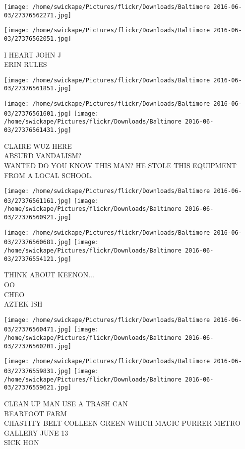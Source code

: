\documentclass[10pt,letterpaper]{article}
\begin{document}
\texttt{[image: /home/swickape/Pictures/flickr/Downloads/Baltimore 2016-06-03/27376562271.jpg]}

\vspace{0.25in}
\texttt{[image: /home/swickape/Pictures/flickr/Downloads/Baltimore 2016-06-03/27376562051.jpg]}

I HEART JOHN J\\
ERIN RULES
\pagebreak

\texttt{[image: /home/swickape/Pictures/flickr/Downloads/Baltimore 2016-06-03/27376561851.jpg]}

\vspace{0.25in}
\texttt{[image: /home/swickape/Pictures/flickr/Downloads/Baltimore 2016-06-03/27376561601.jpg]}
\texttt{[image: /home/swickape/Pictures/flickr/Downloads/Baltimore 2016-06-03/27376561431.jpg]}

CLAIRE WUZ HERE\\
ABSURD VANDALISM?\\
WANTED DO YOU KNOW THIS MAN?  HE STOLE THIS EQUIPMENT FROM A LOCAL SCHOOL.
\pagebreak

\texttt{[image: /home/swickape/Pictures/flickr/Downloads/Baltimore 2016-06-03/27376561161.jpg]}
\texttt{[image: /home/swickape/Pictures/flickr/Downloads/Baltimore 2016-06-03/27376560921.jpg]}

\texttt{[image: /home/swickape/Pictures/flickr/Downloads/Baltimore 2016-06-03/27376560681.jpg]}
\texttt{[image: /home/swickape/Pictures/flickr/Downloads/Baltimore 2016-06-03/27376554121.jpg]}

THINK ABOUT KEENON...\\
OO\\
CHEO\\
AZTEK ISH
\pagebreak

\texttt{[image: /home/swickape/Pictures/flickr/Downloads/Baltimore 2016-06-03/27376560471.jpg]}
\texttt{[image: /home/swickape/Pictures/flickr/Downloads/Baltimore 2016-06-03/27376560201.jpg]}

\texttt{[image: /home/swickape/Pictures/flickr/Downloads/Baltimore 2016-06-03/27376559831.jpg]}
\texttt{[image: /home/swickape/Pictures/flickr/Downloads/Baltimore 2016-06-03/27376559621.jpg]}

CLEAN UP MAN USE A TRASH CAN\\
BEARFOOT FARM\\
CHASTITY BELT COLLEEN GREEN WHICH MAGIC PURRER METRO GALLERY JUNE 13\\
SICK HON
\pagebreak
\end{document}
